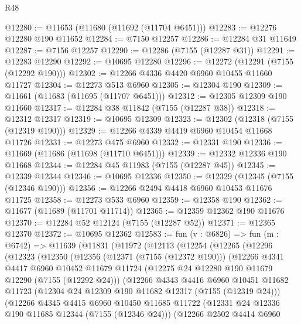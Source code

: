 \begin{lexlean}{R48}
\begin{coremodule}
@12280 := @11653 (@11680 (@11692 (@11704 @6451)))
@12283 := @12276 @12280 @190 @11652
@12284 := @7150 @12257
@12286 := @12284 @31 @11649
@12287 := @7156 @12257
@12290 := @12286 (@7155 (@12287 @31))
@12291 := @12283 @12290
@12292 := @10695 @12280
@12296 := @12272 (@12291 (@7155 (@12292 @190)))
@12302 := @12266 @4336 @4420 @6960 @10455 @11660 @11727
@12304 := @12273 @513 @6960
@12305 := @12304 @190
@12309 := @11661 (@11683 (@11695 (@11707 @6451)))
@12312 := @12305 @12309 @190 @11660
@12317 := @12284 @38 @11842 (@7155 (@12287 @38))
@12318 := @12312 @12317
@12319 := @10695 @12309
@12323 := @12302 (@12318 (@7155 (@12319 @190)))
@12329 := @12266 @4339 @4419 @6960 @10454 @11668 @11726
@12331 := @12273 @475 @6960
@12332 := @12331 @190
@12336 := @11669 (@11686 (@11698 (@11710 @6451)))
@12339 := @12332 @12336 @190 @11668
@12344 := @12284 @45 @11983 (@7155 (@12287 @45))
@12345 := @12339 @12344
@12346 := @10695 @12336
@12350 := @12329 (@12345 (@7155 (@12346 @190)))
@12356 := @12266 @2494 @4418 @6960 @10453 @11676 @11725
@12358 := @12273 @533 @6960
@12359 := @12358 @190
@12362 := @11677 (@11689 (@11701 @11714))
@12365 := @12359 @12362 @190 @11676
@12370 := @12284 @52 @12124 (@7155 (@12287 @52))
@12371 := @12365 @12370
@12372 := @10695 @12362
@12583 := fun (v : @6826) =>
  fun (m : @6742) =>
  @11639
    (@11831
      (@11972
        (@12113
          (@12254
            (@12265
              (@12296
                (@12323
                  (@12350
                    (@12356
                      (@12371 (@7155 (@12372 @190)))
                      (@12266
                        @4341
                        @4417
                        @6960
                        @10452
                        @11679
                        @11724
                        (@12275 @24 @12280 @190 @11679 @12290 (@7155 (@12292 @24)))
                        (@12266
                          @4343
                          @4416
                          @6960
                          @10451
                          @11682
                          @11723
                          (@12304 @24 @12309 @190 @11682 @12317 (@7155 (@12319 @24)))
                          (@12266
                            @4345
                            @4415
                            @6960
                            @10450
                            @11685
                            @11722
                            (@12331 @24 @12336 @190 @11685 @12344 (@7155 (@12346 @24)))
                            (@12266
                              @2502
                              @4414
                              @6960

\end{coremodule}
\end{lexlean}
